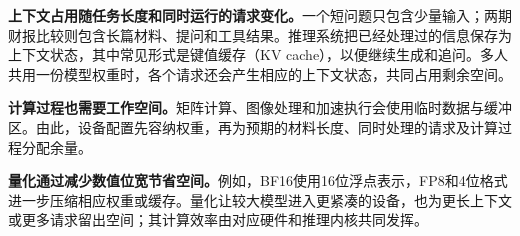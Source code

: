 \textbf{上下文占用随任务长度和同时运行的请求变化。}一个短问题只包含少量输入；两期财报比较则包含长篇材料、提问和工具结果。推理系统把已经处理过的信息保存为上下文状态，其中常见形式是键值缓存（KV cache），以便继续生成和追问。多人共用一份模型权重时，各个请求还会产生相应的上下文状态，共同占用剩余空间。

\textbf{计算过程也需要工作空间。}矩阵计算、图像处理和加速执行会使用临时数据与缓冲区。由此，设备配置先容纳权重，再为预期的材料长度、同时处理的请求及计算过程分配余量。

\textbf{量化通过减少数值位宽节省空间。}例如，BF16使用16位浮点表示，FP8和4位格式进一步压缩相应权重或缓存。量化让较大模型进入更紧凑的设备，也为更长上下文或更多请求留出空间；其计算效率由对应硬件和推理内核共同发挥。
